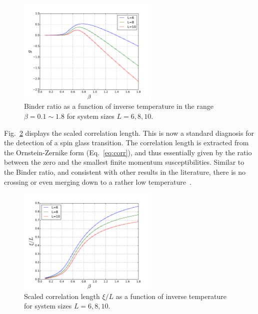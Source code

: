 \begin{figure}[ht]
\centering

\centering
  \includegraphics[width=0.6\textwidth]{img/binder.pdf}%
  \caption{\label{fig:b-h0} Binder ratio as a function of inverse temperature in the
range  $\beta=0.1\sim1.8$ for system sizes $L=6,8,10$.}
\label{fig:Binder}
\end{figure}

Fig.~\ref{fig:c-h0} displays the scaled correlation length. This is now a standard 
diagnosis for the detection of a spin glass transition. The correlation length is 
extracted from the Ornstein-Zernike form (Eq.~\ref{eq:corr}), and thus essentially given by the ratio 
between the zero and the smallest finite momentum susceptibilities. 
Similar to the Binder ratio, and consistent with other results in the literature, 
there is no crossing or even merging down to a rather low temperature~\cite{Young-Katzgraber2004}.

\begin{figure}[ht]
\centering

  \includegraphics[width=0.6\textwidth]{img/corr.pdf}%
  \caption{\label{fig:c-h0} Scaled correlation length $\xi/L$ as a function of inverse temperature for system sizes $L=6,8,10$.  }
\end{figure}


